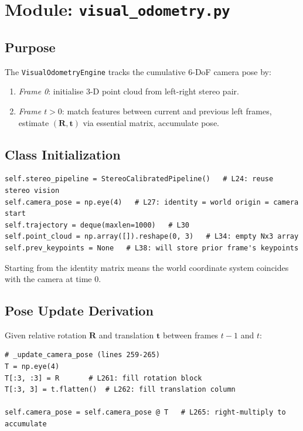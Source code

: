 \documentclass[12pt,a4paper,twoside]{report}
\theoremstyle{definition}
\newcommand{\vect}[1]{\bm{#1}}
\newcommand{\mat}[1]{\mathbf{#1}}
\newcommand{\code}[1]{\texttt{#1}}
\begin{document}
\chapter{Module: \texttt{visual\_odometry.py}}

\section{Purpose}

The \code{VisualOdometryEngine} tracks the cumulative 6-DoF camera pose by:
\begin{enumerate}
  \item \emph{Frame 0}: initialise 3-D point cloud from left-right stereo pair.
  \item \emph{Frame $t>0$}: match features between current and previous left frames,
        estimate $(\mat{R},\vect{t})$ via essential matrix, accumulate pose.
\end{enumerate}

\section{Class Initialization}

\begin{lstlisting}
self.stereo_pipeline = StereoCalibratedPipeline()   # L24: reuse stereo vision
self.camera_pose = np.eye(4)   # L27: identity = world origin = camera start
self.trajectory = deque(maxlen=1000)   # L30
self.point_cloud = np.array([]).reshape(0, 3)   # L34: empty Nx3 array
self.prev_keypoints = None   # L38: will store prior frame's keypoints
\end{lstlisting}

\noindent Starting from the identity matrix means the world coordinate system
coincides with the camera at time 0.

\section{Pose Update Derivation}

Given relative rotation $\mat{R}$ and translation $\vect{t}$ between frames
$t-1$ and $t$:

\begin{lstlisting}
# _update_camera_pose (lines 259-265)
T = np.eye(4)
T[:3, :3] = R       # L261: fill rotation block
T[:3, 3] = t.flatten()  # L262: fill translation column

self.camera_pose = self.camera_pose @ T   # L265: right-multiply to accumulate
\end{lstlisting}
\end{document}
